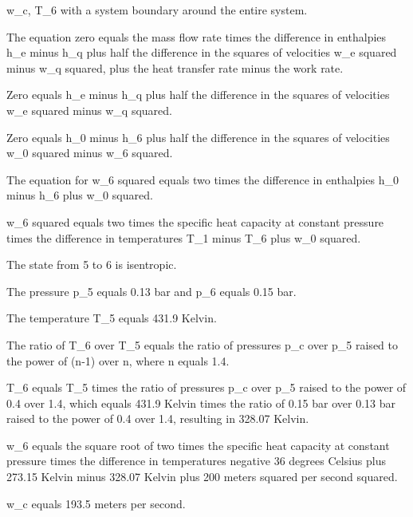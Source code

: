 w_c, T_6 with a system boundary around the entire system.

The equation zero equals the mass flow rate times the difference in enthalpies h_e minus h_q plus half the difference in the squares of velocities w_e squared minus w_q squared, plus the heat transfer rate minus the work rate.

Zero equals h_e minus h_q plus half the difference in the squares of velocities w_e squared minus w_q squared.

Zero equals h_0 minus h_6 plus half the difference in the squares of velocities w_0 squared minus w_6 squared.

The equation for w_6 squared equals two times the difference in enthalpies h_0 minus h_6 plus w_0 squared.

w_6 squared equals two times the specific heat capacity at constant pressure times the difference in temperatures T_1 minus T_6 plus w_0 squared.

The state from 5 to 6 is isentropic.

The pressure p_5 equals 0.13 bar and p_6 equals 0.15 bar.

The temperature T_5 equals 431.9 Kelvin.

The ratio of T_6 over T_5 equals the ratio of pressures p_c over p_5 raised to the power of (n-1) over n, where n equals 1.4.

T_6 equals T_5 times the ratio of pressures p_c over p_5 raised to the power of 0.4 over 1.4, which equals 431.9 Kelvin times the ratio of 0.15 bar over 0.13 bar raised to the power of 0.4 over 1.4, resulting in 328.07 Kelvin.

w_6 equals the square root of two times the specific heat capacity at constant pressure times the difference in temperatures negative 36 degrees Celsius plus 273.15 Kelvin minus 328.07 Kelvin plus 200 meters squared per second squared.

w_c equals 193.5 meters per second.